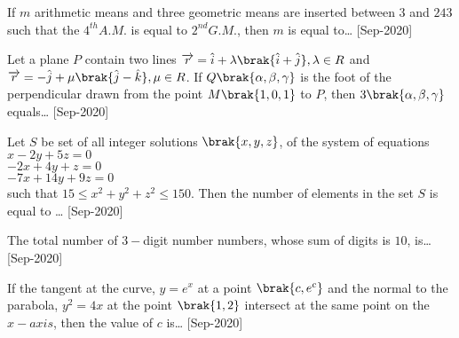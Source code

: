 \iffalse
\title{2020}
\author{EE24BTECH11021}
\section{integer}
\fi
    \item If $m$ arithmetic means and three geometric means  are inserted between $3$ and $243$ such that the $4^{th} A.M.$ is equal to $2^{nd}G.M.$, then $m$ is equal to\dots
    \hfill{[Sep-2020]}
    \item Let a plane $P$ contain two lines $\overrightarrow{r}=\hat{i}+\lambda\brak{\hat{i}+\hat{j}},\lambda\in R$ and $\overrightarrow{r}= -\hat{j}+\mu\brak{\hat{j}-\hat{k}},\mu\in R$. If $Q\brak{\alpha,\beta,\gamma}$ is the foot of the perpendicular drawn from the point $M\brak{1,0,1}$ to $P$, then $3\brak{\alpha,\beta,\gamma}$ equals\dots
    \hfill{[Sep-2020]}
    \item Let $S$ be set of all integer solutions $\brak{x,y,z}$, of the system of equations\\
        $x-2y+5z=0$\\
        $-2x+4y+z=0$\\
        $-7x+14y+9z=0$\\
        such that $15\leq x^2+y^2+z^2\leq 150$. Then the number of elements in the set $S$ is equal to \dots
       \hfill{[Sep-2020]}
    \item The total number of $3-$digit number numbers, whose sum of digits is $10$, is\dots
    \hfill{[Sep-2020]}
    \item If the tangent at the curve, $y=e^x$ at a point $\brak{c,e^c}$ and the normal to the parabola, $y^2=4x$ at the point $\brak{1,2}$ intersect at the same point on the $x-axis$, then the value of $c$ is\dots 
    \hfill{[Sep-2020]}
